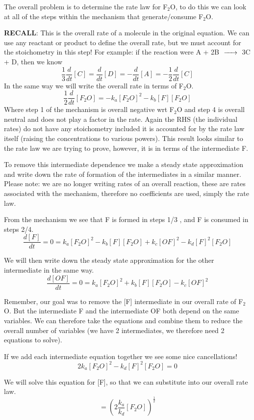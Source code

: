 \documentclass{article}
\newcommand{\be}{\begin{equation}}
\newcommand{\ee}{\end{equation}}
\begin{document}
The overall problem is to determine the rate law for F$_2$O, to do this we can look at all of the steps within the mechanism that generate/consume F$_2$O. 

\bigskip

\textbf{RECALL}: This is the overall rate of a molecule in the original equation. 
We can use any reactant or product to define the overall rate, but we must account for the stoichometry in this step!
For example: if the reaction were A + 2B $\ce{->}$ 3C + D, then we know
\be
\frac{1}{3}\frac{d}{dt}[C] = \frac{d}{dt}[D] = -\frac{d}{dt}[A] = -\frac{1}{2}\frac{d}{dt}[C]
\ee
In the same way we will write the overall rate in terms of F$_2$O. 
\be
\frac{1}{2}\frac{d}{dt}[F_2O] = -k_a[F_2O]^2 - k_b[F][F_2O] 
\ee
Where step 1 of the mechanism is overall negative wrt F$_2$O and step 4 is overall neutral and does not play a factor in the rate. 
Again the RHS (the individual rates) do not have any stoichometry included it is accounted for by the rate law itself (raising the concentrations to various powers). 
This result looks similar to the rate law we are trying to prove, however, it is in terms of the intermediate F.

To remove this intermediate dependence we make a steady state approximation and write down the rate of formation of the intermediates in a similar manner. 
Please note: we are no longer writing rates of an overall reaction, these are rates associated with the mechanism, therefore no coefficients are used, simply the rate law. 

From the mechanism we see that F is formed in steps 1/3 , and F is consumed in steps 2/4. 
\be
\frac{d[F]}{dt} = 0 = k_a [F_2O]^2 - k_b[F][F_2O] + k_c[OF]^2 -k_d[F]^2[F_2O]
\ee

We will then write down the steady state approximation for the other intermediate in the same way. 
\be
\frac{d[OF]}{dt} = 0 = k_a[F_2O]^2 + k_b[F][F_2O] - k_c[OF]^2 
\ee

Remember, our goal was to remove the [F] intermediate in our overall rate of F$_2$O.
But the intermediate F and the intermediate OF both depend on the same variables.
We can therefore take the equations and combine them to reduce the overall number of variables (we have 2 intermediates, we therefore need 2 equations to solve). 

If we add each intermediate equation together we see some nice cancellations! 
\be
2k_a[F_2O]^2 - k_d[F]^2[F_2O] = 0 
\ee

We will solve this equation for [F], so that we can substitute into our overall rate law. 
\be
[F] = \left(2\frac{k_a}{k_d}[F_2O]\right)^{\frac{1}{2}}
\ee
\end{document}
